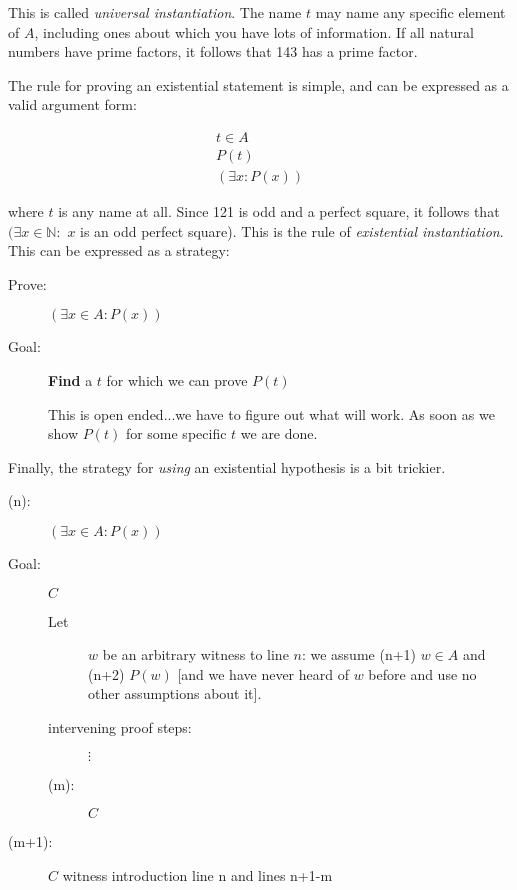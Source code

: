 \documentclass[12pt]{article}
\begin{document}
This is called {\em universal instantiation\/}.  The name $t$ may name any specific element of $A$, including ones about which you have lots of information.  If all natural numbers have prime factors, it follows that 143 has a prime factor.

The rule for proving an existential statement is simple, and can be expressed as a valid argument form:

$$\begin{array}{c}

t \in A \\

P(t) \\ \hline

(\exists x:P(x))
\end{array}$$

where $t$ is any name at all.  Since 121 is odd and a perfect square, it follows that $(\exists x \in {\mathbb N}:$  $x$ is an odd perfect square).  This is the rule of {\em existential instantiation\/}.
\newpage
This can be expressed as a strategy:

\begin{description}
\item[Prove:] $(\exists x \in A:P(x))$

\item[Goal:]  {\bf Find} a $t$ for which we can prove $P(t)$

This is open ended...we have to figure out what will work.  As soon as we show $P(t)$ for some specific $t$ we are done.

\end{description}

Finally, the strategy for {\em using\/} an existential hypothesis is a bit trickier.

\begin{description}

\item[(n):]  $(\exists x \in A:P(x))$

\item[Goal:] $C$

\begin{description}
 \item[Let]  $w$ be an arbitrary witness to line $n$:  we assume (n+1) $w \in A$ and (n+2) $P(w)$ [and we have never heard of $w$ before and use no other assumptions about it].

\item[intervening proof steps:]  $\vdots$

\item[(m):]  $C$

\end{description}

\item[(m+1):]  $C$ witness introduction line n and lines n+1-m

\end{description}
\end{document}

